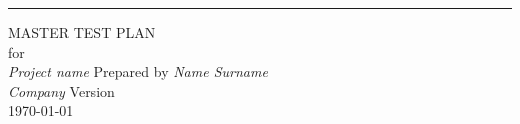 	
\begin{titlepage}
	\begin{flushright}
		\rule{15cm}{5pt}\vskip1cm
		\begin{bfseries}
			\Huge{MASTER TEST PLAN}\\
			\vspace{2cm}
			\Large{for}\\
			\vspace{1.5cm}
			\LARGE{
				\textit{Project name}
			}
			\vfill
			Prepared by \textit{Name Surname}\\
			\vspace{2cm}
			\Large{
				\textit{Company}
			}
			\vfill
			\Large{Version \myversion}\\
			\vfill
			{\large \today}
		\end{bfseries}
	\end{flushright}
\end{titlepage}